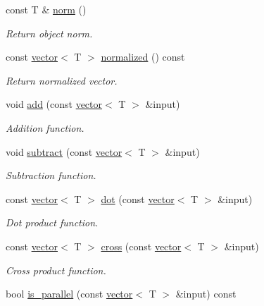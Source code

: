 \begin{DoxyCompactItemize}
const T \& \hyperlink{classddd_1_1vector_a77aea495c4aeaf8645d4ef94d1a0afb2}{norm} ()
\begin{DoxyCompactList}\small\item\em Return object norm. \end{DoxyCompactList}\item 
\mbox{\label{classddd_1_1vector_a40b593b08a2dd6af92c5c07bb9faa463}} 
const \hyperlink{classddd_1_1vector}{vector}$<$ T $>$ \hyperlink{classddd_1_1vector_a40b593b08a2dd6af92c5c07bb9faa463}{normalized} () const
\begin{DoxyCompactList}\small\item\em Return normalized vector. \end{DoxyCompactList}\item 
void \hyperlink{classddd_1_1vector_a97eca6a6625002022ab2442b5cbd0462}{add} (const \hyperlink{classddd_1_1vector}{vector}$<$ T $>$ \&input)
\begin{DoxyCompactList}\small\item\em Addition function. \end{DoxyCompactList}\item 
void \hyperlink{classddd_1_1vector_abf367c7da55ad2c770a90a3ed3c01d5a}{subtract} (const \hyperlink{classddd_1_1vector}{vector}$<$ T $>$ \&input)
\begin{DoxyCompactList}\small\item\em Subtraction function. \end{DoxyCompactList}\item 
const \hyperlink{classddd_1_1vector}{vector}$<$ T $>$ \hyperlink{classddd_1_1vector_a61e3ccdb85f4d41c142c80b429808baf}{dot} (const \hyperlink{classddd_1_1vector}{vector}$<$ T $>$ \&input)
\begin{DoxyCompactList}\small\item\em Dot product function. \end{DoxyCompactList}\item 
const \hyperlink{classddd_1_1vector}{vector}$<$ T $>$ \hyperlink{classddd_1_1vector_a27ac4cb7a469642d497cfe070935ab4b}{cross} (const \hyperlink{classddd_1_1vector}{vector}$<$ T $>$ \&input)
\begin{DoxyCompactList}\small\item\em Cross product function. \end{DoxyCompactList}\item 
bool \hyperlink{classddd_1_1vector_ac3fc063a06940c9893579b1f53f1dda0}{is\+\_\+parallel} (const \hyperlink{classddd_1_1vector}{vector}$<$ T $>$ \&input) const

\end{DoxyCompactItemize}
